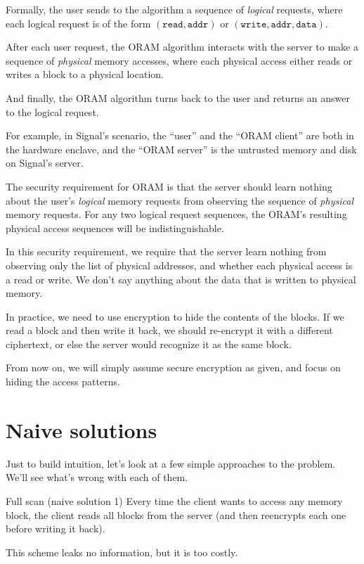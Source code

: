 Formally, the user sends to the algorithm a sequence of \emph{logical}
requests, where each logical request is of the form
$(\texttt{read},\texttt{addr})$ or
$(\texttt{write}, \texttt{addr}, \texttt{data})$.

After each user request, the ORAM algorithm interacts with the server to
make a sequence of \emph{physical} memory accesses, where each physical
access either reads or writes a block to a physical location.

And finally, the ORAM algorithm turns back to the user and returns an
answer to the logical request.

For example, in Signal's scenario, the ``user'' and the ``ORAM client''
are both in the hardware enclave, and the ``ORAM server'' is the
untrusted memory and disk on Signal's server.

The security requirement for ORAM is that the server should learn
nothing about the user's \emph{logical} memory requests from observing the
sequence of \emph{physical} memory requests. For any two logical request
sequences, the ORAM's resulting physical access sequences will be
indistinguishable.

\begin{remark}{}{}
In this security requirement, we require that the server learn nothing
from observing only the list of physical addresses, and whether each
physical access is a read or write. We don't say anything about the
data that is written to physical memory.

In practice, we need to use encryption to hide the contents of the
blocks. If we read a block and then write it back, we should re-encrypt
it with a different ciphertext, or else the server would recognize it as
the same block.

From now on, we will simply assume secure encryption as given, and focus
on hiding the access patterns.
\end{remark}

\section{Naive solutions}\label{naive-solutions}

Just to build intuition, let's look at a few simple approaches to the problem.
We'll see what's wrong with each of them.

\begin{algo}{Full scan (naive solution 1)}{}
Every time the client wants to access any memory block,
the client reads all blocks from the server
(and then reencrypts each one before writing it back).

This scheme leaks no information, but it is too costly.
\end{algo}

